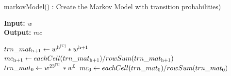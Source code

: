 \documentclass{article}
\begin{document}
\begin{algorithm}
\caption{markovModel() : Create the Markov Model with transition probabilities)}
\label{pseudoPSO}
\hspace*{\algorithmicindent} \textbf{Input:}  \textit{w} \\
\hspace*{\algorithmicindent} \textbf{Output:}  \textit{mc}
\begin{algorithmic}[1]
		\State $trn\_mat\textsubscript{h+1} \gets w\textsuperscript{h\textsuperscript{\text{[T]}}} * w\textsuperscript{h+1}$
		\State $mc\textsubscript{h+1} \gets eachCell(trn\_mat\textsubscript{h+1})/rowSum(trn\_mat\textsubscript{h+1})$
	\Else
		\State $trn\_mat\textsubscript{0} \gets w\textsuperscript{23\textsuperscript{\text{[T]}}} * w\textsuperscript{0}$
		\State $mc\textsubscript{0} \gets eachCell(trn\_mat\textsubscript{0})/rowSum(trn\_mat\textsubscript{0})$
	\EndIf
\EndFor
\end{algorithmic}
\end{algorithm}
\end{document}
